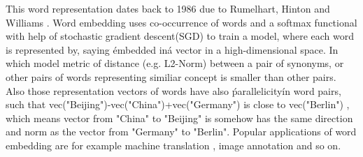 \documentclass[11pt,a4paper]{article}
\begin{document}
This word representation dates back to 1986 due to Rumelhart, Hinton and Williams \cite{williams1986learning}. Word embedding uses co-occurrence of words and a softmax functional with help of stochastic gradient descent(SGD) to train a model, where each word is represented by, saying \'embedded in\' a vector in a high-dimensional space. In which model metric of distance (e.g. L2-Norm) between a pair of synonyms, or other pairs of words representing similiar concept is smaller than other pairs. Also those representation vectors of words have also \'parallelicity\' in word pairs, such that vec("Beijing")-vec("China")+vec("Germany") is close to vec("Berlin") \cite{le2014distributed}, which means vector from "China" to "Beijing" is somehow has the same direction and norm as the vector from "Germany" to "Berlin". Popular applications of word embedding are for example machine translation \cite{cho2014learning}, image annotation \cite{weston2011wsabie} and so on. 
\end{document}
